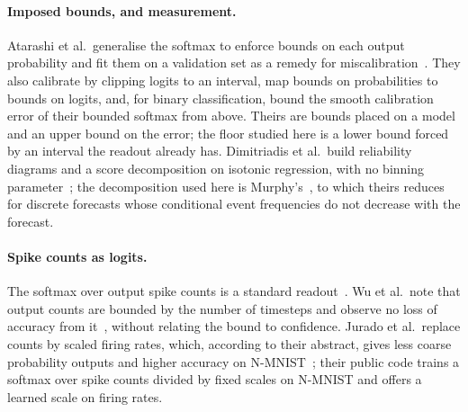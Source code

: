 \documentclass[10pt]{article}
\begin{document}
\paragraph{Imposed bounds, and measurement.}
Atarashi et al.\ generalise the softmax to enforce bounds on each output probability and fit
them on a validation set as a remedy for miscalibration~\citep{atarashi2025bounding}. They also %
calibrate by clipping logits to an interval, map bounds on probabilities to bounds on logits, and,
for binary classification, bound the smooth calibration error of their bounded softmax from
above. Theirs are bounds placed on a model and %
an upper bound on the error; the floor studied here is a lower bound forced by an interval the
readout already has.
Dimitriadis et al.\ build reliability diagrams and a score decomposition on isotonic
regression, with no binning parameter~\citep{dimitriadis2021stable}; the decomposition used %
here is Murphy's~\citep{murphy1973partition}, to which theirs reduces for discrete forecasts %
whose conditional event frequencies do not decrease with the forecast. %

\paragraph{Spike counts as logits.}
The softmax over output spike counts is a standard readout~\citep{wu2019spikecount,shrestha2022spikemax,chen2025knowing}. %
Wu et al.\ note that output counts are bounded by the number of timesteps and observe no loss of
accuracy from it~\citep{wu2019spikecount}, without relating the bound to confidence. Jurado et %
al.\ replace counts by scaled firing rates, which, according to their abstract, gives less coarse
probability outputs and higher accuracy on N-MNIST~\citep{jurado2023spikemoid}; their public code
trains a softmax over spike counts divided by fixed scales on N-MNIST and offers a learned scale on
firing rates. %
\end{document}
